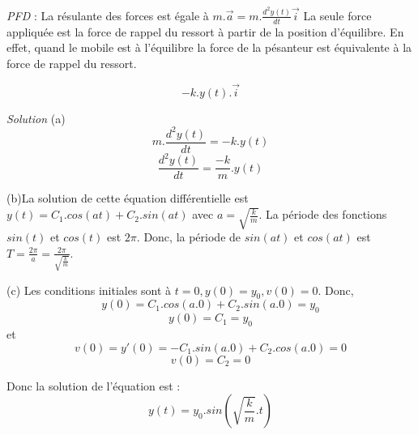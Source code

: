 \documentclass[]{book}
\theoremstyle{definition}
\begin{document}
\emph{PFD} : La r\'esulante des forces est \'egale \`a 
$m.\overrightarrow{a}=m.\frac{d^2y(t)}{dt}\overrightarrow{i}$
La seule force appliqu\'ee est la force de rappel du ressort \`a partir de la position d'\'equilibre. En effet, quand le mobile est \`a l'\'equilibre la force de la p\'esanteur est \'equivalente \`a la force de rappel du ressort.

$$-k.y(t).\overrightarrow{i}$$


\emph{Solution}
(a) \\
$$m.\frac{d^2y(t)}{dt} = -k.y(t)$$
$$\frac{d^2y(t)}{dt} = \frac{-k}{m}.y(t)$$


(b)La solution de cette \'equation diff\'erentielle est $y(t) = C_1.cos(at) + C_2.sin(at)$ avec $a = \sqrt{\frac{k}{m}}$. La p\'eriode des fonctions $sin(t)$ et $cos(t)$ est $2\pi$. Donc, la p\'eriode de $sin(at)$ et $cos(at)$ est $T = \frac{2\pi}{a} = \frac{2\pi}{\sqrt{\frac{k}{m}}}$.


(c) Les conditions initiales sont \`a $t=0, y(0) = y_0, v(0) = 0$. Donc,
$$y(0) = C_1.cos(a.0) + C_2.sin(a.0) = y_0$$
$$y(0) = C_1 = y_0$$
et
$$v(0) = y'(0) = -C_1.sin(a.0) +C_2.cos(a.0) = 0$$
$$v(0) = C_2 = 0$$

Donc la solution de l'\'equation est :
$$y(t) = y_0.sin(\sqrt{\frac{k}{m}}.t)$$
\end{document}
